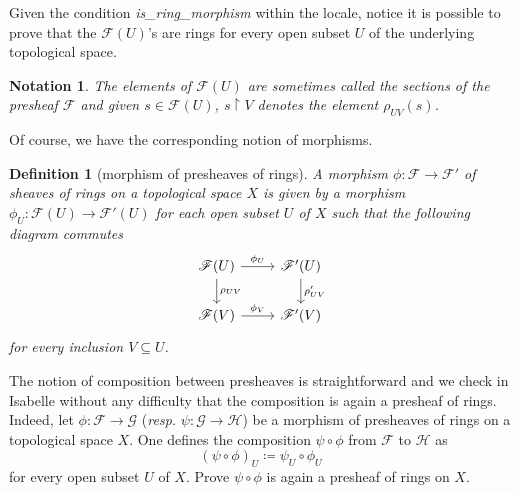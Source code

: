 \documentclass[12pt]{scrartcl}
\newtheorem{definition}[proposition]{Definition}
\newtheorem{notation}{Notation}
\begin{document}

Given the condition \textit{is\_ring\_morphism} within the locale, notice it is possible to prove that the $\mathscr{F}(U)$'s are rings for every open subset $U$ of the underlying topological space.


\begin{notation}
	The elements of $\mathscr{F}(U)$ are sometimes called the sections of the presheaf $\mathscr{F}$ and given $s \in \mathscr{F}(U)$, $s\restriction V$ denotes the element $\rho_{UV}(s)$.
\end{notation}

Of course, we have the corresponding notion of morphisms.

\begin{definition}[morphism of presheaves of rings]
	A morphism $\phi: \mathscr{F} \rightarrow \mathscr{F}'$ of sheaves of rings on a topological space $X$ is given by a morphism $\phi_U: \mathscr{F}(U) \rightarrow \mathscr{F}'(U)$ for each open subset $U$ of $X$ such that  the following diagram commutes
	\[
	\begin{tikzcd}
	\mathscr{F}(U) \arrow[r, "\phi_U"] \arrow[d, "\rho_{UV}"] & \mathscr{F}'(U) \arrow[d, "\rho'_{UV}"] \\
	\mathscr{F}(V) \arrow[r, "\phi_V"] & \mathscr{F}'(V) 
	\end{tikzcd}
	\]
	for every inclusion $V \subseteq U$.
\end{definition}


The notion of composition between presheaves is straightforward and we check in Isabelle without any difficulty that the composition is again a presheaf of rings. \\
Indeed,	let $\phi: \mathscr{F} \rightarrow \mathscr{G}$ (\textit{resp.} $\psi: \mathscr{G} \rightarrow \mathscr{H}$) be a morphism of presheaves of rings on a topological space $X$. One defines the composition $\psi \circ \phi$ from $\mathscr{F}$ to $\mathscr{H}$ as 
	\[
	(\psi \circ \phi)_U \coloneqq \psi_U \circ \phi_U
	\]
	for every open subset $U$ of $X$. Prove $\psi \circ \phi$ is again a presheaf of rings on $X$.

\end{document}
